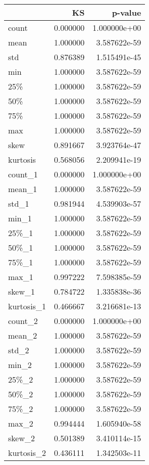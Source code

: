 \begin{tabular}{lrr}
\toprule
{} &        KS &       p-value \\
\midrule
count      &  0.000000 &  1.000000e+00 \\
mean       &  1.000000 &  3.587622e-59 \\
std        &  0.876389 &  1.515491e-45 \\
min        &  1.000000 &  3.587622e-59 \\
25\%        &  1.000000 &  3.587622e-59 \\
50\%        &  1.000000 &  3.587622e-59 \\
75\%        &  1.000000 &  3.587622e-59 \\
max        &  1.000000 &  3.587622e-59 \\
skew       &  0.891667 &  3.923764e-47 \\
kurtosis   &  0.568056 &  2.209941e-19 \\
count\_1    &  0.000000 &  1.000000e+00 \\
mean\_1     &  1.000000 &  3.587622e-59 \\
std\_1      &  0.981944 &  4.539903e-57 \\
min\_1      &  1.000000 &  3.587622e-59 \\
25\%\_1      &  1.000000 &  3.587622e-59 \\
50\%\_1      &  1.000000 &  3.587622e-59 \\
75\%\_1      &  1.000000 &  3.587622e-59 \\
max\_1      &  0.997222 &  7.598385e-59 \\
skew\_1     &  0.784722 &  1.335838e-36 \\
kurtosis\_1 &  0.466667 &  3.216681e-13 \\
count\_2    &  0.000000 &  1.000000e+00 \\
mean\_2     &  1.000000 &  3.587622e-59 \\
std\_2      &  1.000000 &  3.587622e-59 \\
min\_2      &  1.000000 &  3.587622e-59 \\
25\%\_2      &  1.000000 &  3.587622e-59 \\
50\%\_2      &  1.000000 &  3.587622e-59 \\
75\%\_2      &  1.000000 &  3.587622e-59 \\
max\_2      &  0.994444 &  1.605940e-58 \\
skew\_2     &  0.501389 &  3.410114e-15 \\
kurtosis\_2 &  0.436111 &  1.342503e-11 \\

\end{tabular}
